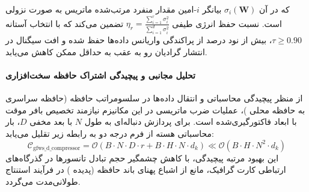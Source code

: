 که در آن $\sigma_i(\mathbf{W})$ بیانگر $i$-امین مقدار منفرد مرتب‌شده ماتریس به صورت نزولی است. نسبت حفظ انرژی طیفی $\eta_r = \frac{\sum_{i=1}^r \sigma_i^2}{\sum_{i=1}^{d} \sigma_i^2}$ تضمین می‌کند که با انتخاب آستانه $\tau \ge 0.90$، بیش از نود درصد از پراکندگی واریانس داده‌ها حفظ شده و افت سیگنال در انتشار گرادیان رو به عقب به حداقل ممکن کاهش می‌یابد.

\paragraph{تحلیل مجانبی و پیچیدگی اشتراک حافظه سخت‌افزاری}
از منظر پیچیدگی محاسباتی و انتقال داده‌ها در سلسومراتب حافظه (حافظه سراسری  به حافظه محلی )، عملیات ضرب ماتریسی در این مکانیزم نیازمند تخصیص بافر موقت با ابعاد فاکتورگیری‌شده است. برای پردازش دنباله‌ای به طول $N$ با بعد مخفی $D$، بار محاسباتی هسته از فرم درجه دو به رابطه زیر تقلیل می‌یابد:
\begin{equation}
\label{eq:complexity_gfws_d_compressor}
\mathcal{C}_{\text{gfws\_d\_compressor}} = \mathcal{O}\left( B \cdot N \cdot D \cdot r + B \cdot H \cdot N \cdot d_k \right) \ll \mathcal{O}\left( B \cdot H \cdot N^2 \cdot d_k \right)
\end{equation}
این بهبود مرتبه پیچیدگی، با کاهش چشمگیر حجم تبادل تانسورها در گذرگاه‌های ارتباطی کارت گرافیک، مانع از اشباع پهنای باند حافظه (پدیده ) در فرآیند استنتاج طولانی‌مدت می‌گردد.
